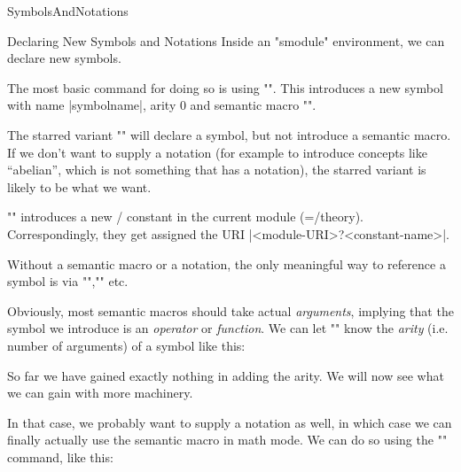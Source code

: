 \begin{smodule}[ns=https://github.com/slatex/sTeX/doc]{SymbolsAndNotations}
\begin{sfragment}{Declaring New Symbols and Notations}
    Inside an \stexcode"smodule" environment, we can declare new
    \sTeX symbols.

    \begin{function}{\symdecl}
        The most basic command for doing so is using
        \stexcode"". This introduces
        a new symbol with name |symbolname|, arity $0$ and 
        semantic macro \stexcode"\symbolname".

        The starred variant \stexcode"" will
        declare a symbol, but not introduce a semantic macro.
        If we don't want to supply a notation (for example to introduce
        concepts like ``abelian'', which is not something that
        has a notation), the starred variant is likely to be what we
        want.
    \end{function}
    \begin{mmtbox}
        \stexcode"\symdecl" introduces a new \omdoc/\mmt
        constant in the current module (=\omdoc/\mmt theory).
        Correspondingly, they get assigned the URI 
        |<module-URI>?<constant-name>|.
    \end{mmtbox}

    Without a semantic macro or a notation, the only 
    meaningful way to reference a symbol
    is via \stexcode"\symref",\stexcode"\symname" etc.


    Obviously, most semantic macros should take actual \emph{arguments},
    implying that the symbol we introduce is an \emph{operator} or
    \emph{function}. We can let \stexcode"\symdecl" know the
    \emph{arity} (i.e. number of arguments) of a symbol like this:


    So far we have gained exactly nothing in adding the arity. We will now see what we can
    gain with more machinery.
    
    \begin{function}{\notation}
        In that case, we probably want to supply a notation as well,
        in which case we can finally actually use 
        the semantic macro in math mode.
        We can do so using the \stexcode"\notation" command, like this:
    \end{function}


\end{sfragment}
\end{smodule}
